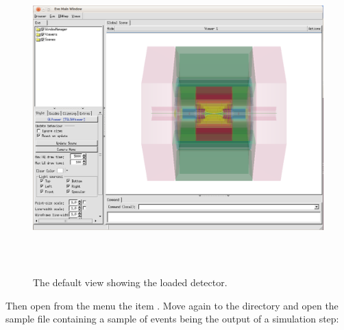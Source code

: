 \documentclass[10pt,a4paper]{article}
\begin{document}
\begin{figure}[t]
  \begin{center}
    \includegraphics[height=120mm] {DDEve_3.png}
    \caption{The \DDE default view showing the loaded detector.}
    \label{fig:DDEve_3.png}
  \end{center}
\end{figure}

\newpage
\noindent
Then open from the  menu the item . Move again to the 
directory  and open the sample file
 containing a sample of events being the output of 
a \DDG simulation step:
\end{document}
